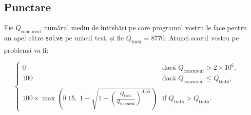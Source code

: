 \documentclass[12pt]{article}
\begin{document}



\newpage
\subsection{Punctare}

Fie $Q_{\text{concurent}}$ numărul mediu de întrebări pe care programul vostru le face pentru un apel către \texttt{solve} pe unicul test, și fie $Q_{\text{țintă}}=8770$. Atunci scorul vostru pe problemă va fi:

\[
\begin{cases}
0 & \text{dacă } Q_{\text{concurent}} > 2\times 10^6, \\
100 & \text{dacă } Q_{\text{concurent}} \le Q_{\text{țintă}}, \\
100 \times \max\left(0.15,\; 1-\sqrt{1-\left(\frac{Q_{\text{țintă}}}{Q_{\text{concurent}}}\right)^{0.55}}\right) & \text{if } Q_{\text{țintă}} > Q_{\text{țintă}}.
\end{cases}
\]
\end{document}
